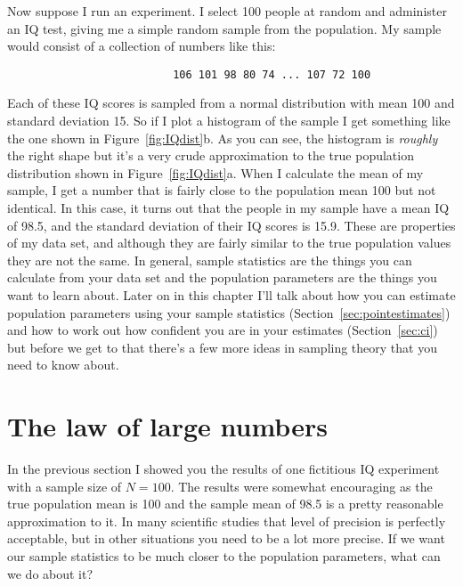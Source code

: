 Now suppose I run an experiment. I select 100 people at random and administer an IQ test, giving me a simple random sample from the population. My sample would consist of a collection of numbers like this:
\begin{verbatim}
                          106 101 98 80 74 ... 107 72 100
\end{verbatim}
Each of these IQ scores is sampled from a normal distribution with mean 100 and standard deviation 15. So if I  plot a histogram of the sample I get something like the one shown in Figure~\ref{fig:IQdist}b. As you can see, the histogram is {\it roughly} the right shape but it's a very crude approximation to the true population distribution shown in Figure~\ref{fig:IQdist}a. When I calculate the mean of my sample, I get a number that is fairly close to the population mean 100 but not identical. In this case, it turns out that the people in my sample have a mean IQ of 98.5, and the standard deviation of their IQ scores is 15.9. These  are properties of my data set, and although they are fairly similar to the true population values they are not the same. In general, sample statistics are the things you can calculate from your data set and the population parameters are the things you want to learn about. Later on in this chapter I'll talk about how you can estimate population parameters using your sample statistics (Section~\ref{sec:pointestimates}) and how to work out how confident you are in your estimates (Section~\ref{sec:ci}) but before we get to that there's a few more ideas in sampling theory that you need to know about. 


\section{The law of large numbers~\label{sec:lawlargenumbers}}

In the previous section I showed you the results of one fictitious IQ experiment with a sample size of $N=100$. The results were somewhat encouraging as the true population mean is 100 and the sample mean of 98.5 is a pretty reasonable approximation to it. In many scientific studies that level of precision is perfectly acceptable, but in other situations you need to be a lot more precise. If we want our sample statistics to be much closer to the population parameters, what can we do about it?

